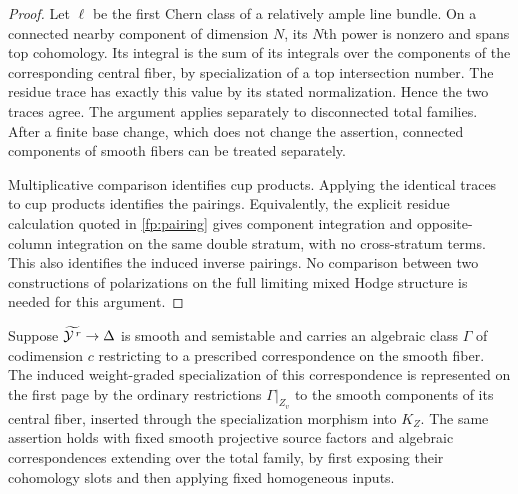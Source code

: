 \begin{proof}
Let $\ell$ be the first Chern class of a relatively ample line bundle.  On a
connected nearby component of dimension $N$, its $N$th power is nonzero and
spans top cohomology.  Its integral is the sum of its integrals over the
components of the corresponding central fiber, by specialization of a top
intersection number.  The residue trace has exactly this value by its stated
normalization.  Hence the two traces agree.  The argument applies separately
to disconnected total families.  After a finite base change, which does not
change the assertion, connected components of smooth fibers can be treated
separately.

Multiplicative comparison identifies cup products.  Applying the identical
traces to cup products identifies the pairings.  Equivalently, the explicit
residue calculation quoted in \cref{fp:pairing} gives component integration
and opposite-column integration on the same double stratum, with no
cross-stratum terms.  This also identifies the induced inverse pairings.
No comparison between two constructions of polarizations on the full limiting
mixed Hodge structure is needed for this argument.
\end{proof}

\begin{lemma}
\label{fp:leading-class}
Suppose $\widetilde{\mathcal Y^{\,r}}\to\Delta$ is smooth and semistable and carries
an algebraic class $\Gamma$ of codimension $c$ restricting to a prescribed
correspondence on the smooth fiber.  The induced weight-graded specialization
of this correspondence is represented on the first page by the ordinary
restrictions $\Gamma|_{Z_v}$ to the smooth components of its central fiber,
inserted through the specialization morphism into $K_Z$.
The same assertion holds with fixed smooth projective source factors and
algebraic correspondences extending over the total family, by first exposing
their cohomology slots and then applying fixed homogeneous inputs.
\end{lemma}

